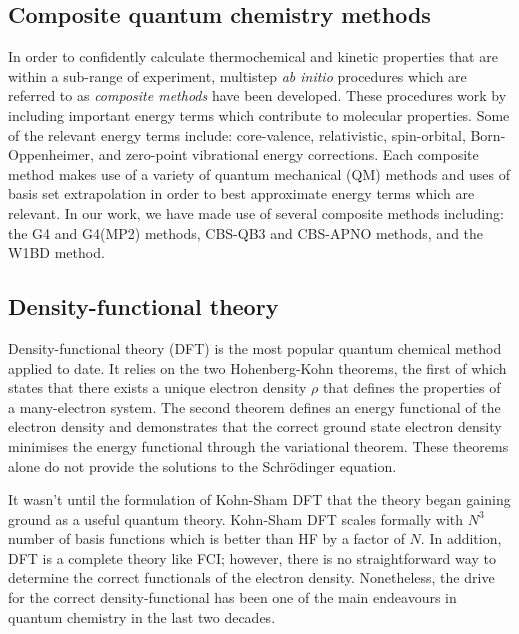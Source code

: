 \subsection{Composite quantum chemistry methods}

In order to confidently calculate thermochemical and kinetic properties that are
within a sub-\kcalmol range of experiment, multistep \emph{ab initio} procedures
which are referred to as \emph{composite methods} have been
developed.\cite{Karton2016} These procedures work by including important energy
terms which contribute to molecular properties. Some of the relevant energy
terms include: core-valence, relativistic, spin-orbital, Born-Oppenheimer, and
zero-point vibrational energy corrections. Each composite method makes use of a
variety of quantum mechanical (QM) methods and uses of basis set extrapolation in
order to best approximate energy terms which are relevant. In our work, we have
made use of several composite methods including: the G4 and G4(MP2)
methods,\cite{Curtiss2007,Curtiss2007a} CBS-QB3 and CBS-APNO
methods,\cite{Montgomery1999,Montgomery2000,Ochterski1996} and the W1BD
method.\cite{Barnes2009}


\subsection{Density-functional theory}

Density-functional theory (DFT) is the most popular quantum chemical method
applied to date. It relies on the two Hohenberg-Kohn theorems, the first of
which states that there exists a unique electron density $\rho$ that defines the
properties of a many-electron system. The second theorem defines an energy
functional of the electron density and demonstrates that the correct ground
state electron density minimises the energy functional through the variational
theorem. \cite{Hohenberg1964,Koch2000} These theorems alone do not provide the
solutions to the Schr{\"o}dinger equation.

It wasn't until the formulation of Kohn-Sham DFT\cite{Kohn1965} that the theory
began gaining ground as a useful quantum theory. Kohn-Sham DFT scales formally
with $N^3$ number of basis functions\cite{Cramer2004} which is better than HF by
a factor of $N$. In addition, DFT is a complete theory like FCI; however, there
is no straightforward way to determine the correct functionals of the electron
density. Nonetheless, the drive for the correct density-functional has been one
of the main endeavours in quantum chemistry in the last two decades.

